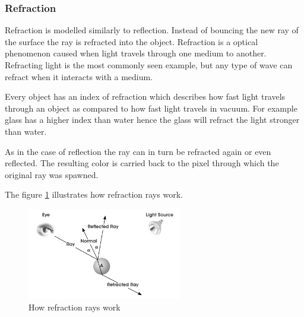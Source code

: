 \documentclass[DIV10, abstracton, openright, footsepline, headsepline, twoside, 9pt,
bigheadings]{scrreprt}
\begin{document}
\subsubsection{Refraction}
Refraction is modelled similarly to reflection. Instead of bouncing the new ray
of the surface the ray is refracted into the object. Refraction is a optical
phenomenon caused when light travels through one medium to another. Refracting
light is the most commonly seen example, but any type of wave can refract when
it interacts with a medium.

Every object has an index of refraction which describes how fast light travels
through an object as compared to how fast light travels in vacuum. For example
glass has a higher index than water hence the glass will refract the light
stronger than water.

As in the case of reflection the ray can in turn be refracted again or even
reflected. The resulting color is carried back to the pixel through which the
original ray was spawned.

The figure \ref{fig:refraction} illustrates how refraction rays work.

\begin{figure}[H]
\centering
\includegraphics[width=0.6\textwidth]{bilder/refraction}
\caption{How refraction rays work}
\label{fig:refraction}
\end{figure}
\end{document}
